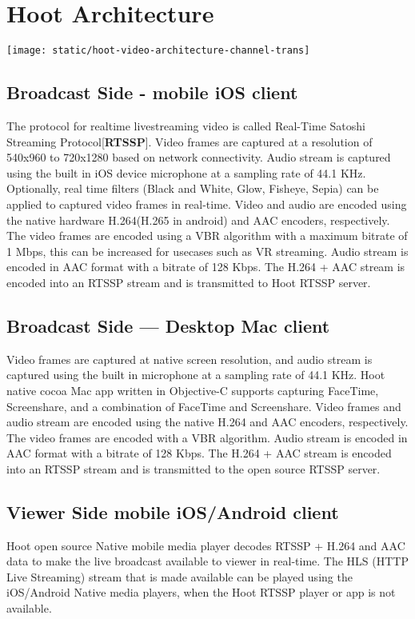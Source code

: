 \section{Hoot Architecture}

\texttt{[image: static/hoot-video-architecture-channel-trans]}

\subsection{Broadcast Side - mobile iOS client}
The protocol for realtime livestreaming video is called Real-Time Satoshi Streaming Protocol[\textbf{RTSSP}].
Video frames are captured at a resolution of 540x960 to 720x1280 based on network connectivity. Audio stream is captured using the built in iOS device microphone at a sampling rate of 44.1 KHz. Optionally, real time filters (Black and White, Glow, Fisheye, Sepia) can be applied to captured video frames in real-time. Video and audio are encoded using the native hardware H.264(H.265 in android) and AAC encoders, respectively. The video frames are encoded using a VBR algorithm with a maximum bitrate of 1 Mbps, this can be increased for usecases such as VR streaming. Audio stream is encoded in AAC format with a bitrate of 128 Kbps. The H.264 + AAC stream is encoded into an RTSSP stream and is transmitted to Hoot RTSSP server.

\subsection{Broadcast Side — Desktop Mac client}
Video frames are captured at native screen resolution, and audio stream is captured using the built in microphone at a sampling rate of 44.1 KHz. Hoot native cocoa Mac app written in Objective-C supports capturing FaceTime, Screenshare, and a combination of FaceTime and Screenshare. Video frames and audio stream are encoded using the native H.264 and AAC encoders, respectively. The video frames are encoded with a VBR algorithm. Audio stream is encoded in AAC format with a bitrate of 128 Kbps. The H.264 + AAC stream is encoded into an RTSSP stream and is transmitted to the open source RTSSP server.

\subsection{Viewer Side mobile iOS/Android client }
 Hoot open source Native mobile media player decodes RTSSP + H.264 and AAC data to make the live broadcast available to viewer in real-time. The HLS (HTTP Live Streaming) stream that is made available can be played using the iOS/Android Native media players, when the Hoot RTSSP player or app is not available.

